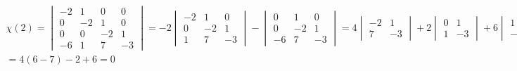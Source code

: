 \begin{multline*}
    \chi(2) =
    \begin{vmatrix}
        -2 & 1 & 0 & 0 \\
        0 & -2 & 1 & 0 \\
        0 & 0 & -2 & 1 \\
        -6 & 1 & 7 & -3
    \end{vmatrix} = -2
    \begin{vmatrix}
        -2 & 1 & 0 \\
        0 & -2 & 1 \\
        1 & 7 & -3
    \end{vmatrix} -
    \begin{vmatrix}
        0 & 1 & 0 \\
        0 & -2 & 1 \\
        -6 & 7 & -3
    \end{vmatrix} = 4
    \begin{vmatrix}
        -2 & 1 \\
        7 & -3
    \end{vmatrix} + 2
    \begin{vmatrix}
        0 & 1 \\
        1 & -3
    \end{vmatrix} + 6
    \begin{vmatrix}
        1 & 0 \\
        -2 & 1
    \end{vmatrix} = \\
    = 4(6 - 7) - 2 + 6 = 0
\end{multline*}

